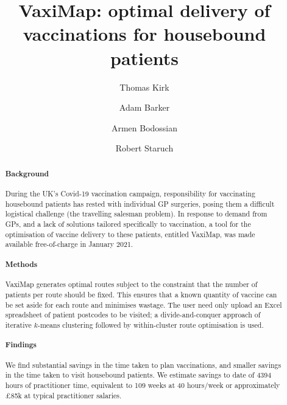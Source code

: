 \documentclass[review]{elsarticle}
\def\vm{VaxiMap}
\begin{document}
\begin{frontmatter}

\title{\vm{}{}: optimal delivery of vaccinations for housebound patients}


\address[IBME]{Institute of Biomedical Engineering, Department of Engineering Science, University of Oxford}

\address[Sqpt]{Squarepoint Capital LLP, London}
\address[Vod]{Vodafone plc, London}

\author[IBME]{Thomas Kirk}

\author[Sqpt]{Adam Barker}
\author[Vod]{Armen Bodossian}
\author[IBME]{Robert Staruch}

\begin{abstract}
\paragraph{Background} During the UK's Covid-19 vaccination campaign, responsibility for vaccinating housebound patients has rested with individual GP surgeries, posing them a difficult logistical challenge (the travelling salesman problem). In response to demand from GPs, and a lack of solutions tailored specifically to vaccination, a tool for the optimisation of vaccine delivery to these patients, entitled \vm{}, was made available free-of-charge in January 2021. 

\paragraph{Methods} \vm{} generates optimal routes subject to the constraint that the number of patients per route should be fixed. This ensures that a known quantity of vaccine can be set aside for each route and minimises wastage. The user need only upload an Excel spreadsheet of patient postcodes to be visited; a divide-and-conquer approach of iterative $k$-means clustering followed by within-cluster route optimisation is used. 

\paragraph{Findings} We find substantial savings in the time taken to plan vaccinations, and smaller savings in the time taken to visit housebound patients. We estimate savings to date of 4394 hours of practitioner time, equivalent to 109 weeks at 40 hours/week or approximately £85k at typical practitioner salaries. 


\end{abstract}
\end{frontmatter}
\end{document}
